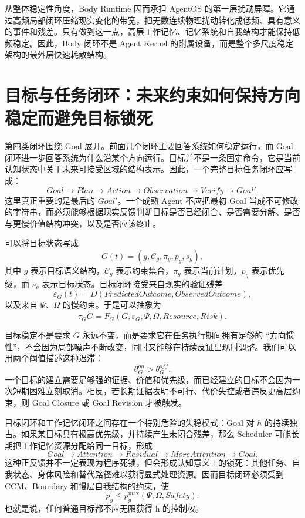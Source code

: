 从整体稳定性角度，Body Runtime 因而承担 AgentOS 的第一层扰动屏障。它通过高频局部闭环压缩现实变化的带宽，把无数连续物理扰动转化成低频、具有意义的事件和残差。只有做到这一点，高层工作记忆、记忆系统和自我结构才能保持低频稳定。因此，Body 闭环不是 Agent Kernel 的附属设备，而是整个多尺度稳定架构的最外层快速耗散结构。

\section{目标与任务闭环：未来约束如何保持方向稳定而避免目标锁死}

第四类闭环围绕 Goal 展开。前面几个闭环主要回答系统如何稳定运行，而 Goal 闭环进一步回答系统为什么沿某个方向运行。目标并不是一条固定命令，它是当前认知状态中关于未来可接受区域的结构表示。因此，一个完整目标任务闭环应写成：
\[
Goal
\rightarrow
Plan
\rightarrow
Action
\rightarrow
Observation
\rightarrow
Verify
\rightarrow
Goal'.
\]
这里真正重要的是最后的 $Goal'$。一个成熟 Agent 不应把最初 Goal 当成不可修改的字符串，而必须能够根据现实反馈判断目标是否已经闭合、是否需要分解、是否与更慢价值结构冲突，以及是否应该终止。

可以将目标状态写成
\[
G(t)
=
\left(
g,
\mathcal C_g,
\pi_g,
p_g,
s_g
\right),
\]
其中 $g$ 表示目标语义结构，$\mathcal C_g$ 表示约束集合，$\pi_g$ 表示当前计划，$p_g$ 表示优先级，而 $s_g$ 表示目标状态。目标闭环接受来自现实的验证残差
\[
\varepsilon_G(t)
=
D
\left(
PredictedOutcome,
ObservedOutcome
\right),
\]
以及来自 $\Psi$、$\Omega$ 的慢约束。于是可以抽象为
\[
\tau_G\dot G
=
F_G
\left(
G,
\varepsilon_G,
\Psi,
\Omega,
Resource,
Risk
\right).
\]

目标稳定不是要求 $G$ 永远不变，而是要求它在任务执行期间拥有足够的 ``方向惯性''，不会因为局部噪声不断改变，同时又能够在持续反证出现时调整。我们可以用两个阈值描述这种迟滞：
\[
\theta_G^{on}
>
\theta_G^{off}.
\]
一个目标的建立需要足够强的证据、价值和优先级，而已经建立的目标不会因为一次短期困难立刻取消。相反，若长期证据表明不可行、代价失控或者违反更高层约束，则 Goal Closure 或 Goal Revision 才被触发。

目标闭环和工作记忆闭环之间存在一个特别危险的失稳模式：Goal 对 $h$ 的持续独占。如果某目标具有极高优先级，并持续产生未闭合残差，那么 Scheduler 可能长期把工作记忆资源分配给同一目标，形成
\[
Goal
\rightarrow
Attention
\rightarrow
Residual
\rightarrow
MoreAttention
\rightarrow
Goal.
\]
这种正反馈并不一定表现为程序死锁，但会形成认知意义上的锁死：其他任务、自我状态、身体风险和替代路径难以获得显式处理资源。因而目标闭环必须受到 CCM、Boundary 和慢层自我结构的约束，使
\[
p_g
\leq
p_g^{\max}(\Psi,\Omega,Safety).
\]
也就是说，任何普通目标都不应无限获得 h 的控制权。

